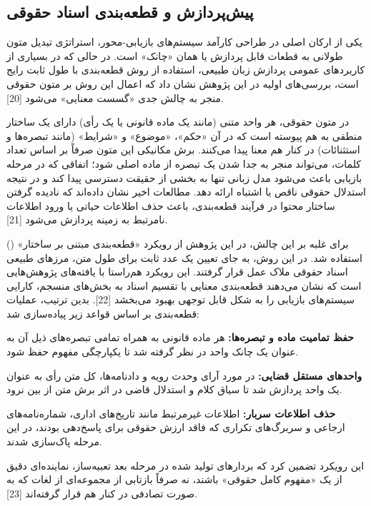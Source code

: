 \documentclass[12pt,a4paper]{report}
\begin{document}
	\subsection{پیش‌پردازش و قطعه‌بندی اسناد حقوقی}
	
	یکی از ارکان اصلی در طراحی کارآمد سیستم‌های بازیابی-محور، استراتژی تبدیل متون طولانی به قطعات قابل پردازش یا همان «چانک»  است. در حالی که در بسیاری از کاربردهای عمومی پردازش زبان طبیعی، استفاده از روش قطعه‌بندی با طول ثابت  رایج است، بررسی‌های اولیه در این پژوهش نشان داد که اعمال این روش بر متون حقوقی منجر به چالش جدی «گسست معنایی» می‌شود [20].
	
	در متون حقوقی، هر واحد متنی (مانند یک ماده قانونی یا یک رأی) دارای یک ساختار منطقی به هم پیوسته است که در آن «حکم»، «موضوع» و «شرایط» (مانند تبصره‌ها و استثنائات) در کنار هم معنا پیدا می‌کنند. برش مکانیکی این متون صرفاً بر اساس تعداد کلمات، می‌تواند منجر به جدا شدن یک تبصره از ماده اصلی شود؛ اتفاقی که در مرحله بازیابی باعث می‌شود مدل زبانی تنها به بخشی از حقیقت دسترسی پیدا کند و در نتیجه استدلال حقوقی ناقص یا اشتباه ارائه دهد. مطالعات اخیر نشان داده‌اند که نادیده گرفتن ساختار محتوا در فرآیند قطعه‌بندی، باعث حذف اطلاعات حیاتی یا ورود اطلاعات نامرتبط به زمینه پردازش می‌شود [21].
	
	برای غلبه بر این چالش، در این پژوهش از رویکرد «قطعه‌بندی مبتنی بر ساختار» () استفاده شد. در این روش، به جای تعیین یک عدد ثابت برای طول متن، مرزهای طبیعی اسناد حقوقی ملاک عمل قرار گرفتند. این رویکرد هم‌راستا با یافته‌های پژوهش‌هایی است که نشان می‌دهند قطعه‌بندی معنایی  با تقسیم اسناد به بخش‌های منسجم، کارایی سیستم‌های بازیابی را به شکل قابل توجهی بهبود می‌بخشد [22]. بدین ترتیب، عملیات قطعه‌بندی بر اساس قواعد زیر پیاده‌سازی شد:
	
	\textbf{حفظ تمامیت ماده و تبصره‌ها:} هر ماده قانونی به همراه تمامی تبصره‌های ذیل آن به عنوان یک چانک واحد در نظر گرفته شد تا یکپارچگی مفهوم حفظ شود.
	
	\textbf{واحد‌های مستقل قضایی:} در مورد آرای وحدت رویه و دادنامه‌ها، کل متن رأی به عنوان یک واحد پردازش شد تا سیاق کلام و استدلال قاضی در اثر برش متن از بین نرود.
	
	\textbf{حذف اطلاعات سربار:} اطلاعات غیرمرتبط مانند تاریخ‌های اداری، شماره‌نامه‌های ارجاعی و سربرگ‌های تکراری که فاقد ارزش حقوقی برای پاسخ‌دهی بودند، در این مرحله پاک‌سازی شدند.
	
	این رویکرد تضمین کرد که بردارهای تولید شده در مرحله بعد تعبیه‌ساز، نماینده‌ای دقیق از یک «مفهوم کامل حقوقی» باشند، نه صرفاً بازتابی از مجموعه‌ای از لغات که به صورت تصادفی در کنار هم قرار گرفته‌اند [23].
	
\end{document}
